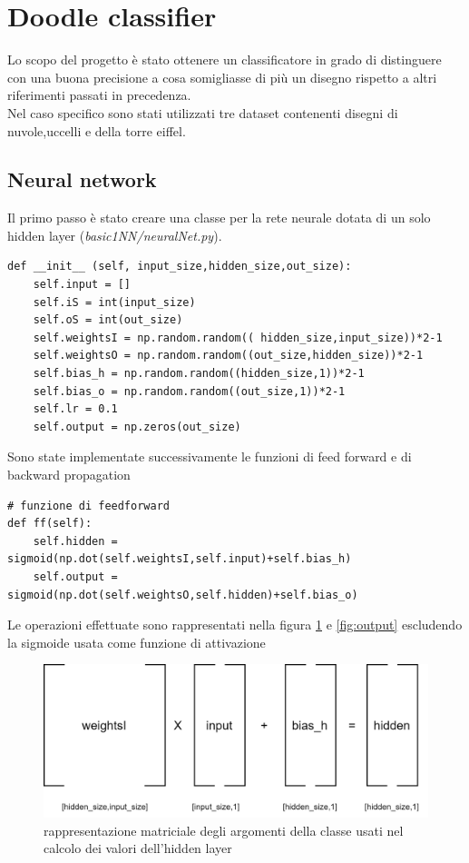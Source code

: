 \documentclass[12pt]{article}
\begin{document}
\section{Doodle classifier}
Lo scopo del progetto è stato ottenere un classificatore in grado di distinguere con una buona precisione a cosa somigliasse di più un disegno rispetto a altri riferimenti passati in precedenza.\\
Nel caso specifico sono stati utilizzati tre dataset contenenti disegni di nuvole,uccelli e della torre eiffel.
\subsection{Neural network}
Il primo passo è stato creare una classe per la rete neurale dotata di un solo hidden layer (\textit{basic1NN/neuralNet.py}). 
\begin{lstlisting}[language=myPython]
 def __init__ (self, input_size,hidden_size,out_size):
	self.input = []
	self.iS = int(input_size)
	self.oS = int(out_size)	
	self.weightsI = np.random.random(( hidden_size,input_size))*2-1
	self.weightsO = np.random.random((out_size,hidden_size))*2-1
	self.bias_h = np.random.random((hidden_size,1))*2-1
	self.bias_o = np.random.random((out_size,1))*2-1
	self.lr = 0.1
	self.output = np.zeros(out_size)
\end{lstlisting}
\newpage
Sono state implementate successivamente le funzioni di feed forward e di backward propagation
\begin{lstlisting}[language=myPython]
# funzione di feedforward
def ff(self): 
	self.hidden = sigmoid(np.dot(self.weightsI,self.input)+self.bias_h)
	self.output = sigmoid(np.dot(self.weightsO,self.hidden)+self.bias_o)
\end{lstlisting}
Le operazioni effettuate sono rappresentati nella figura \ref{fig:hidden} e \ref{fig:output} escludendo la sigmoide usata come funzione di attivazione
\begin{figure}[h!]
	\centering
	\includegraphics[width=10 cm]{resources/hidden.png}
	\caption{rappresentazione matriciale degli argomenti della classe usati nel calcolo dei valori dell'hidden layer}
	\label{fig:hidden}
\end{figure}
\end{document}
